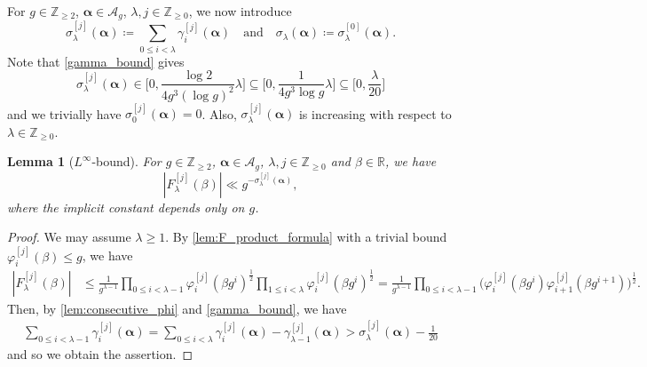 \documentclass[hidelinks]{amsart}
\numberwithin{equation}{section}
\theoremstyle{plain}
\newtheorem{lemma}{Lemma}
\theoremstyle{definition}
\let\tmp\phi
\let\phi\varphi
\let\varphi\tmp
\let\tmp\epsilon
\let\epsilon\varepsilon
\let\varepsilon\tmp
\renewcommand{\subset}{\subseteq}
\begin{document}
For $g\in\mathbb{Z}_{\ge2}$, $\bm{\alpha}\in\mathscr{A}_{g}$, $\lambda,j\in\mathbb{Z}_{\ge0}$, we now introduce
\begin{equation}
\label{def:sigma_j_alpha}
\sigma_{\lambda}^{[j]}(\bm{\alpha})
\coloneqq
\sum_{0\le i<\lambda}
\gamma_{i}^{[j]}(\bm{\alpha})
\quad\text{and}\quad
\sigma_{\lambda}(\bm{\alpha})
\coloneqq
\sigma_{\lambda}^{[0]}(\bm{\alpha}).
\end{equation}
Note that \cref{gamma_bound} gives
\begin{equation}
\label{sigma_bound}
\sigma_{\lambda}^{[j]}(\bm{\alpha})
\in
\biggl[0,\frac{\log 2}{4g^{3}(\log g)^{2}}\lambda\biggr]
\subset
\biggl[0,\frac{1}{4g^{3}\log g}\lambda\biggr]
\subset
\biggl[0,\frac{\lambda}{20}\biggr]
\end{equation}
and we trivially have $\sigma_{0}^{[j]}(\bm{\alpha})=0$.
Also, $\sigma_{\lambda}^{[j]}(\bm{\alpha})$ is increasing with respect to $\lambda\in\mathbb{Z}_{\ge0}$.
\begin{lemma}[$L^{\infty}$-bound]
\label{lem:L_infty_general}
For $g\in\mathbb{Z}_{\ge2}$, $\bm{\alpha}\in\mathscr{A}_{g}$,
$\lambda,j\in\mathbb{Z}_{\ge0}$ and $\beta\in\mathbb{R}$, we have
\[
|F_{\lambda}^{[j]}(\beta)|
\ll
g^{-\sigma_{\lambda}^{[j]}(\bm{\alpha})},
\]
where the implicit constant depends only on $g$.
\end{lemma}
\begin{proof}
We may assume $\lambda\ge1$.
By \cref{lem:F_product_formula} with a trivial bound $\phi_{i}^{[j]}(\beta)\le g$, we have
\begin{align}
|F_{\lambda}^{[j]}(\beta)|
&\le
\frac{1}{g^{\lambda-1}}
\prod_{0\le i<\lambda-1}
\phi_{i}^{[j]}(\beta g^{i})^{\frac{1}{2}}
\prod_{1\le i<\lambda}
\phi_{i}^{[j]}(\beta g^{i})^{\frac{1}{2}}
=
\frac{1}{g^{\lambda-1}}
\prod_{0\le i<\lambda-1}
\bigl(
\phi_{i}^{[j]}(\beta g^{i})
\phi_{i+1}^{[j]}(\beta g^{i+1})
\bigr)^{\frac{1}{2}}.
\end{align}
Then, by \cref{lem:consecutive_phi} and \cref{gamma_bound}, we have
\begin{align}
\sum_{0\le i<\lambda-1}
\gamma_{i}^{[j]}(\bm{\alpha})
=
\sum_{0\le i<\lambda}
\gamma_{i}^{[j]}(\bm{\alpha})
-
\gamma_{\lambda-1}^{[j]}(\bm{\alpha})
>
\sigma_{\lambda}^{[j]}(\bm{\alpha})
-
\frac{1}{20}
\end{align}
and so we obtain the assertion.
\end{proof}

\end{document}
